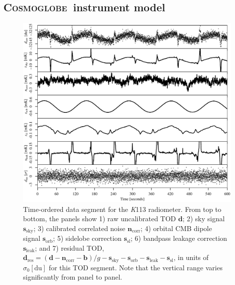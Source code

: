 \documentclass[twocolumn]{../../common/aa}
\newcommand{\cosmoglobe}{\textsc{Cosmoglobe}}
\newcommand{\K}[0]{\textit K}
\begin{document}
\subsection{\cosmoglobe\ instrument model}
\label{sec:cosmoglobe_instmodel}

\begin{figure}
	\includegraphics[width=\textwidth]{figures/K113_timestreams.pdf}
	\caption{Time-ordered data segment for the \K113 radiometer. From top to bottom, the panels show 1) raw uncalibrated TOD $\boldsymbol d$; 2) sky signal $\boldsymbol s_\mathrm{sky}$; 3) calibrated correlated noise $\boldsymbol n_\mathrm{corr}$; 4) orbital CMB dipole signal $\boldsymbol s_\mathrm{orb}$; 5) sidelobe correction $\boldsymbol s_\mathrm{sl}$; 6) bandpass leakage correction $\boldsymbol s_\mathrm{leak}$; and 7) residual TOD, $\boldsymbol d_\mathrm{res}=(\boldsymbol d -\boldsymbol n_\mathrm{corr}-\boldsymbol b)/g-\boldsymbol s_\mathrm{sky}-\boldsymbol s_\mathrm{orb}-\boldsymbol s_\mathrm{leak} -\boldsymbol s_\mathrm{sl}$, in units of $\sigma_0[\mathrm{du}]$ for this TOD segment. Note that the vertical range varies significantly from panel to panel.
		}
	\label{fig:timestreams}
\end{figure}
\end{document}
